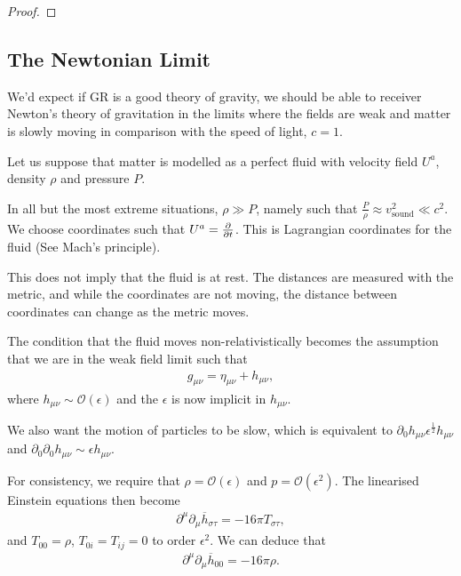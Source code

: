 \begin{proof}
    
\end{proof}

\subsection{The Newtonian Limit}

We'd expect if GR is a good theory of gravity, we should be able to receiver Newton's theory of gravitation in the limits where the fields are weak and matter is slowly moving in comparison with the speed of light, $c = 1$.

Let us suppose that matter is modelled as a perfect fluid with velocity field $U^{a}$, density $\rho$ and pressure $P$.

In all but the most extreme situations, $\rho \gg P$, namely such that $\frac{P}{\rho} \approx v_{\text{sound}}^2 \ll c^2$. We choose coordinates such that $U^{a} = \pdv{t}$. This is Lagrangian coordinates for the fluid (See Mach's principle).

\begin{note}
    This does not imply that the fluid is at rest. The distances are measured with the metric, and while the coordinates are not moving, the distance between coordinates can change as the metric moves.
\end{note}

The condition that the fluid moves non-relativistically becomes the assumption that we are in the weak field limit such that
\begin{align}
    g_{\mu \nu} = \eta_{\mu \nu} + h_{\mu \nu}
,\end{align}
where $h_{\mu \nu} \sim  \mathcal{O} \left( \epsilon \right) $ and the $\epsilon$ is now implicit in $h_{\mu \nu}$.

We also want the motion of particles to be slow, which is equivalent to $\partial_0 h_{\mu \nu} \epsilon^{\frac{1}{2}} h_{\mu \nu}$ and $\partial_0 \partial_0 h_{\mu \nu} \sim  \epsilon h_{\mu \nu}$.

For consistency, we require that $\rho = \mathcal{O}\left( \epsilon \right) $ and $p = \mathcal{O}\left( \epsilon^2 \right) $. The linearised Einstein equations then become
\begin{align}
    \partial^{\mu} \partial_\mu \overline{h}_{\sigma \tau} = -16 \pi T_{\sigma \tau}
,\end{align}
and $T_{0 0 } = \rho$, $T_{0i} = T_{ij} = 0$ to order $\epsilon^2$. We can deduce that
\begin{align}
    \partial^{\mu} \partial_\mu \overline{h}_{0 0 }= -16 \pi \rho
.\end{align}

